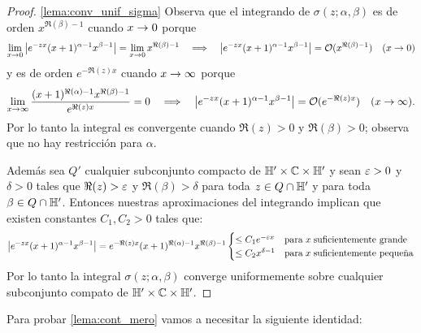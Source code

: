 \begin{proof}\ref{lema:conv_unif_sigma}
  Observa que el integrando de $\sigma(z;\alpha,\beta)$ es de orden $x^{\Re(\beta)-1}$ cuando
$x\rightarrow0$ porque 
\[
  \lim_{x\rightarrow0}\left| e^{-zx}(x+1)^{\alpha-1}x^{\beta-1} \right|=\lim_{x\rightarrow0}x^{\Re(\beta)-1}\quad\Longrightarrow\quad
  \left| e^{-zx}(x+1)^{\alpha-1}x^{\beta-1} \right|=\mathcal{O}(x^{\Re(\beta)-1})\quad(x\rightarrow0)
\]
y es de orden $e^{-\Re(z)x}$ cuando $x\rightarrow\infty$ porque
\[
  \lim_{x\rightarrow\infty}\frac{(x+1)^{\Re(\alpha)-1}x^{\Re(\beta)-1}}{e^{\Re(z)x}}=0 \quad\Longrightarrow\quad
  \left| e^{-zx}(x+1)^{\alpha-1}x^{\beta-1} \right|=\mathcal{O}(e^{-\Re(z)x})\quad(x\rightarrow\infty).
\]
Por lo tanto la integral es convergente cuando $\Re(z)>0$ y $\Re(\beta)>0$; observa que no hay
restricci\'on para $\alpha$.

Adem\'as sea $Q'$ cualquier subconjunto compacto de $\mathbb{H}'\times\mathbb{C}\times\mathbb{H}'$ y sean $\varepsilon>0$ y
$\delta>0$ tales que $\Re(z)>\varepsilon$ y $\Re(\beta)>\delta$ para toda $z\in Q\cap\mathbb{H}'$ y para toda
$\beta\in Q\cap\mathbb{H}'$. Entonces nuestras aproximaciones del integrando implican que existen
constantes $C_1,C_2>0$ tales que:
\[
  \left| e^{-zx}(x+1)^{\alpha-1}x^{\beta-1} \right|=e^{-\Re(z)x}(x+1)^{\Re(\alpha)-1}x^{\Re(\beta)-1}
  \begin{cases}
    \leq C_1e^{-\varepsilon x} &\text{para}\;x\;\text{suficientemente grande}\\
    \leq C_2x^{\delta-1} &\text{para}\;x\;\text{suficientemente peque\~na}
  \end{cases}
\]
Por lo tanto la integral $\sigma(z;\alpha,\beta)$ converge uniformemente sobre cualquier
subconjunto compato de $\mathbb{H}'\times\mathbb{C}\times\mathbb{H}'$.
\end{proof}

Para probar \ref{lema:cont_mero} vamos a necesitar la siguiente identidad:

